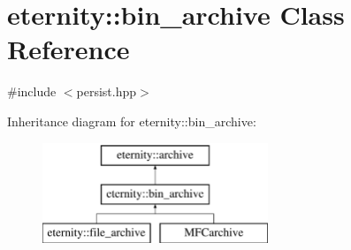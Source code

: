 \hypertarget{classeternity_1_1bin__archive}{}\section{eternity\+:\+:bin\+\_\+archive Class Reference}
\label{classeternity_1_1bin__archive}


{\ttfamily \#include $<$persist.\+hpp$>$}

Inheritance diagram for eternity\+:\+:bin\+\_\+archive\+:\begin{figure}[H]
\begin{center}
\leavevmode
\includegraphics[height=3.000000cm]{classeternity_1_1bin__archive}
\end{center}
\end{figure}

